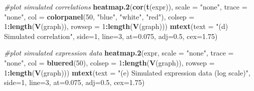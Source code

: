 \documentclass[]{article}
\newenvironment{Shaded}{\begin{snugshade}}{\end{snugshade}}
\newcommand{\CommentTok}[1]{\textcolor[rgb]{0.56,0.35,0.01}{\textit{#1}}}
\newcommand{\DataTypeTok}[1]{\textcolor[rgb]{0.13,0.29,0.53}{#1}}
\newcommand{\DecValTok}[1]{\textcolor[rgb]{0.00,0.00,0.81}{#1}}
\newcommand{\FloatTok}[1]{\textcolor[rgb]{0.00,0.00,0.81}{#1}}
\newcommand{\KeywordTok}[1]{\textcolor[rgb]{0.13,0.29,0.53}{\textbf{#1}}}
\newcommand{\NormalTok}[1]{#1}
\newcommand{\OperatorTok}[1]{\textcolor[rgb]{0.81,0.36,0.00}{\textbf{#1}}}
\newcommand{\StringTok}[1]{\textcolor[rgb]{0.31,0.60,0.02}{#1}}
\begin{document}
\begin{Shaded}
\begin{Highlighting}[]
\CommentTok{#plot simulated correlations}
\KeywordTok{heatmap.2}\NormalTok{(}\KeywordTok{cor}\NormalTok{(}\KeywordTok{t}\NormalTok{(expr)), }\DataTypeTok{scale =} \StringTok{"none"}\NormalTok{, }\DataTypeTok{trace =} \StringTok{"none"}\NormalTok{, }\DataTypeTok{col =} \KeywordTok{colorpanel}\NormalTok{(}\DecValTok{50}\NormalTok{, }\StringTok{"blue"}\NormalTok{, }\StringTok{"white"}\NormalTok{, }\StringTok{"red"}\NormalTok{),}
\DataTypeTok{colsep =} \DecValTok{1}\OperatorTok{:}\KeywordTok{length}\NormalTok{(}\KeywordTok{V}\NormalTok{(graph)), }\DataTypeTok{rowsep =} \DecValTok{1}\OperatorTok{:}\KeywordTok{length}\NormalTok{(}\KeywordTok{V}\NormalTok{(graph)))}
\KeywordTok{mtext}\NormalTok{(}\DataTypeTok{text =} \StringTok{"(d) Simulated correlation"}\NormalTok{, }\DataTypeTok{side=}\DecValTok{1}\NormalTok{, }\DataTypeTok{line=}\DecValTok{3}\NormalTok{, }\DataTypeTok{at=}\FloatTok{0.075}\NormalTok{, }\DataTypeTok{adj=}\FloatTok{0.5}\NormalTok{, }\DataTypeTok{cex=}\FloatTok{1.75}\NormalTok{)}

\CommentTok{#plot simulated expression data}
\KeywordTok{heatmap.2}\NormalTok{(expr, }\DataTypeTok{scale =} \StringTok{"none"}\NormalTok{, }\DataTypeTok{trace =} \StringTok{"none"}\NormalTok{, }\DataTypeTok{col =} \KeywordTok{bluered}\NormalTok{(}\DecValTok{50}\NormalTok{),}
\DataTypeTok{colsep =} \DecValTok{1}\OperatorTok{:}\KeywordTok{length}\NormalTok{(}\KeywordTok{V}\NormalTok{(graph)), }\DataTypeTok{rowsep =} \DecValTok{1}\OperatorTok{:}\KeywordTok{length}\NormalTok{(}\KeywordTok{V}\NormalTok{(graph)))}
\KeywordTok{mtext}\NormalTok{(}\DataTypeTok{text =} \StringTok{"(e) Simulated expression data (log scale)"}\NormalTok{, }\DataTypeTok{side=}\DecValTok{1}\NormalTok{, }\DataTypeTok{line=}\DecValTok{3}\NormalTok{, }\DataTypeTok{at=}\FloatTok{0.075}\NormalTok{, }\DataTypeTok{adj=}\FloatTok{0.5}\NormalTok{, }\DataTypeTok{cex=}\FloatTok{1.75}\NormalTok{)}
\end{Highlighting}
\end{Shaded}
\end{document}
